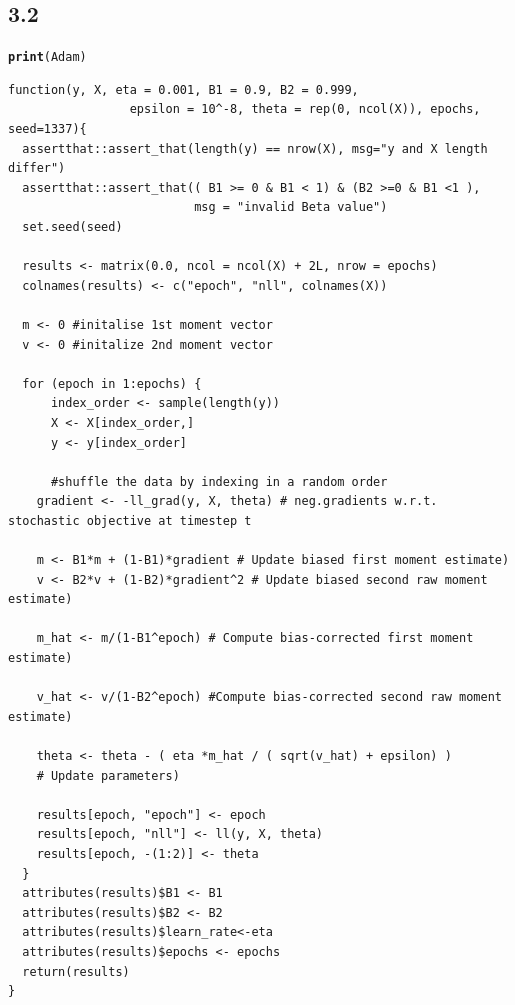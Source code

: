\documentclass[11pt, a4paper, english]{article}\usepackage[]{graphicx}\usepackage[dvipsnames]{xcolor}
\makeatletter
\newcommand{\hlstd}[1]{\textcolor[rgb]{0.345,0.345,0.345}{#1}}%
\newcommand{\hlkwd}[1]{\textcolor[rgb]{0.737,0.353,0.396}{\textbf{#1}}}%
\newenvironment{kframe}{%
 \def\at@end@of@kframe{}%
 \ifinner\ifhmode%
  \def\at@end@of@kframe{\end{minipage}}%
  \begin{minipage}{\columnwidth}%
 \fi\fi%
 \def\FrameCommand##1{\hskip\@totalleftmargin \hskip-\fboxsep
 \colorbox{shadecolor}{##1}\hskip-\fboxsep
     \hskip-\linewidth \hskip-\@totalleftmargin \hskip\columnwidth}%
 \MakeFramed {\advance\hsize-\width
   \@totalleftmargin\z@ \linewidth\hsize
   \@setminipage}}%
 {\par\unskip\endMakeFramed%
 \at@end@of@kframe}
\newenvironment{knitrout}{}{} %
\makeatother
\begin{document}
\subsection{3.2}
\begin{knitrout}
\color{fgcolor}\begin{kframe}
\begin{alltt}
\hlkwd{print}\hlstd{(Adam)}
\end{alltt}
\begin{verbatim}
function(y, X, eta = 0.001, B1 = 0.9, B2 = 0.999,
                 epsilon = 10^-8, theta = rep(0, ncol(X)), epochs, seed=1337){
  assertthat::assert_that(length(y) == nrow(X), msg="y and X length differ")
  assertthat::assert_that(( B1 >= 0 & B1 < 1) & (B2 >=0 & B1 <1 ), 
                          msg = "invalid Beta value")
  set.seed(seed)
  
  results <- matrix(0.0, ncol = ncol(X) + 2L, nrow = epochs)
  colnames(results) <- c("epoch", "nll", colnames(X))
  
  m <- 0 #initalise 1st moment vector
  v <- 0 #initalize 2nd moment vector
  
  for (epoch in 1:epochs) { 
      index_order <- sample(length(y))
      X <- X[index_order,]
      y <- y[index_order]
      
      #shuffle the data by indexing in a random order
    gradient <- -ll_grad(y, X, theta) # neg.gradients w.r.t. stochastic objective at timestep t
     
    m <- B1*m + (1-B1)*gradient # Update biased first moment estimate)
    v <- B2*v + (1-B2)*gradient^2 # Update biased second raw moment estimate)
    
    m_hat <- m/(1-B1^epoch) # Compute bias-corrected first moment estimate)
    
    v_hat <- v/(1-B2^epoch) #Compute bias-corrected second raw moment estimate)
    
    theta <- theta - ( eta *m_hat / ( sqrt(v_hat) + epsilon) ) 
    # Update parameters)
    
    results[epoch, "epoch"] <- epoch
    results[epoch, "nll"] <- ll(y, X, theta)
    results[epoch, -(1:2)] <- theta
  }
  attributes(results)$B1 <- B1
  attributes(results)$B2 <- B2
  attributes(results)$learn_rate<-eta
  attributes(results)$epochs <- epochs
  return(results)
}
\end{verbatim}
\end{kframe}
\end{knitrout}
\end{document}
